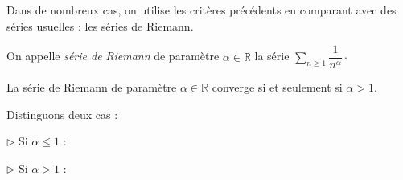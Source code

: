 \documentclass[a4paper,10pt]{report}
\newcommand{\Sum}[2]{\ensuremath{\textstyle{\sum\limits_{#1}^{#2}}}}
\begin{document}
\noindent Dans de nombreux cas, on utilise les critères précédents en comparant avec des séries usuelles : les séries de Riemann.


\begin{defin}
On appelle \textit{série de Riemann} de paramètre $\alpha \in \mathbb{R}$ la série $\Sum{n \geq 1}{} \dfrac{1}{n^{\alpha}} \cdot$
\end{defin}

\begin{thm}
La série de Riemann de paramètre $\alpha \in \mathbb{R}$ converge si et seulement si $\alpha >1$.
\end{thm}

\begin{preuve} Distinguons deux cas :

\noindent $\rhd$ Si $\alpha \leq 1$ :

%

\vspace{3cm}

\noindent $\rhd$ Si $\alpha>1$ :
%

\vspace{8cm}

$\phantom{test}$ 

\vspace{7cm}
\end{preuve}
\end{document}
